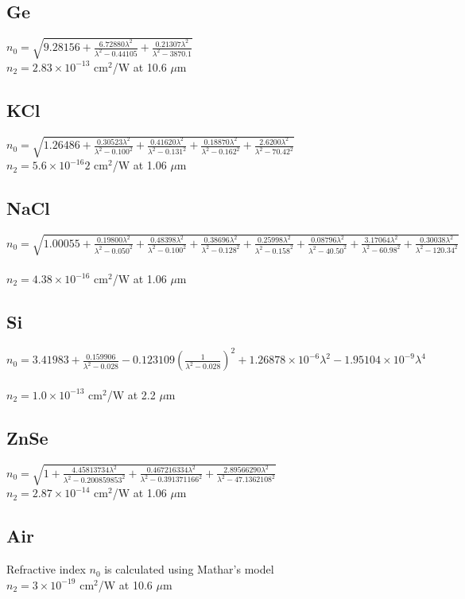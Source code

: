 \documentclass{report}
\begin{document}
\begin{appendices}
\subsection*{Ge}
$n_0=\sqrt{9.28156+\frac{6.72880\lambda^2}{\lambda^2-0.44105}+\frac{0.21307\lambda^2}{\lambda^2-3870.1}}$ \cite{Barnes-1979}\\
$n_2 = 2.83\times 10^{-13}$ cm$^2$/W at 10.6 $\mu$m \cite{Sheik-Bahae-1991}
\subsection*{KCl}
$n_0=\sqrt{1.26486+\frac{0.30523\lambda^2}{\lambda^2-0.100^2}+\frac{0.41620\lambda^2}{\lambda^2-0.131^2}+\frac{0.18870\lambda^2}{\lambda^2-0.162^2}+\frac{2.6200\lambda^2}{\lambda^2-70.42^2}}$ \cite{Li-1976}\\
$n_2 = 5.6 \times 10^{-16}2$ cm$^2$/W at 1.06 $\mu$m \cite{Sheik-Bahae-1991}
\subsection*{NaCl}
$n_0=\sqrt{1.00055+\frac{0.19800\lambda^2}{\lambda^2-0.050^2}+\frac{0.48398\lambda^2}{\lambda^2-0.100^2}+\frac{0.38696\lambda^2}{\lambda^2-0.128^2}+\frac{0.25998\lambda^2}{\lambda^2-0.158^2}+\frac{0.08796\lambda^2}{\lambda^2-40.50^2}+\frac{3.17064\lambda^2}{\lambda^2-60.98^2}+\frac{0.30038\lambda^2}{\lambda^2-120.34^2}}$ \cite{Li-1976}\\
$n_2 = 4.38\times 10^{-16}$ cm$^2$/W at 1.06 $\mu$m \cite{Sheik-Bahae-1991}
\subsection*{Si}
$n_0=3.41983+\frac{0.159906}{\lambda^2-0.028}-0.123109\left(\frac{1}{\lambda^2-0.028}\right)^2+1.26878\times 10^{-6}\lambda^2-1.95104\times 10^{-9}\lambda^4$ \cite{Edwards-1980}\\
$n_2 = 1.0\times 10^{-13}$ cm$^2$/W at 2.2 $\mu$m \cite{Bristow-2007}
\subsection*{ZnSe}
$n_0=\sqrt{1+\frac{4.45813734\lambda^2}{\lambda^2-0.200859853^2}+\frac{0.467216334\lambda^2}{\lambda^2-0.391371166^2}+\frac{2.89566290\lambda^2}{\lambda^2-47.1362108^2}}$ \cite{Tatian-1984}\\
$n_2 = 2.87\times 10^{-14}$ cm$^2$/W at 1.06 $\mu$m \cite{Sheik-Bahae-1991}
\subsection*{Air}
Refractive index $n_0$ is calculated using Mathar's model \cite{Mathar-2007}\\
$n_2 = 3\times 10^{-19}$ cm$^2$/W at 10.6 $\mu$m



\end{appendices}
\end{document}
